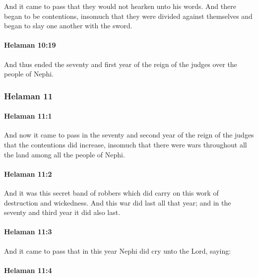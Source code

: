 			And it came to pass that they would not hearken unto his words.
			And there began to be contentions,
			insomuch that they were divided against themselves
			and began to slay one another with the sword.

		\paragraph{Helaman 10:19} %
			\label{HELAMAN-10-19}

			And thus ended the seventy and first year
			of the reign of the judges over the people of Nephi.

	\subsubsection{Helaman 11} %
		\label{HELAMAN-11}
		
		\paragraph{Helaman 11:1} %
			\label{HELAMAN-11-1}

			And now it came to pass
			in the seventy and second year of the reign of the judges
			that the contentions did increase,
			insomuch that there were wars throughout all the land
			among all the people of Nephi.

		\paragraph{Helaman 11:2} %
			\label{HELAMAN-11-2}

			And it was this secret band of robbers
			which did carry on this work of destruction and wickedness.
			And this war did last all that year;
			and in the seventy and third year it did also last.

		\paragraph{Helaman 11:3} %
			\label{HELAMAN-11-3}

			And it came to pass that in this year Nephi did cry unto the Lord, saying:

		\paragraph{Helaman 11:4} %
			\label{HELAMAN-11-4}

